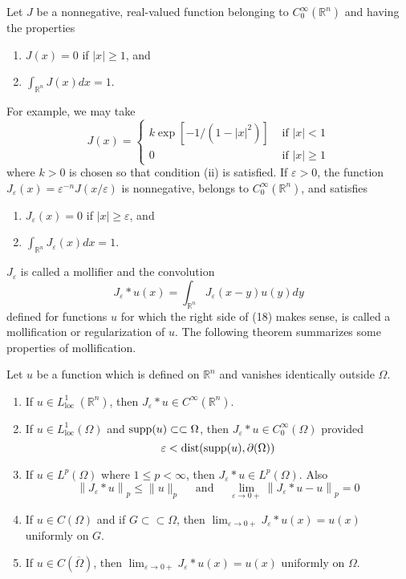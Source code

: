 \begin{para}[Mollifiers]
  Let $J$ be a nonnegative, real-valued function belonging to $C_0^{\infty}(\mathbb{R}^n)$ and having the properties
  \begin{enumerate}[label = (\roman*)]
    \item $J(x)=0$ if $|x| \geq 1$, and
    \item $\int_{\mathbb{R}^n} J(x) d x=1$.
  \end{enumerate}
  For example, we may take
  \[
  J(x)= \begin{cases}k \exp \left[-1 /\left(1-|x|^2\right)\right] & \text { if }|x|<1 \\ 0 & \text { if }|x| \geq 1\end{cases}
  \]
  where $k>0$ is chosen so that condition (ii) is satisfied. If $\varepsilon>0$, the function $J_\varepsilon(x)=\varepsilon^{-n} J(x / \varepsilon)$ is nonnegative, belongs to $C_0^{\infty}(\mathbb{R}^n)$, and satisfies
  \begin{enumerate}[label = (\roman*)]
    \item $J_\varepsilon(x)=0$ if $|x| \geq \varepsilon$, and
    \item $\int_{\mathbb{R}^n} J_\varepsilon(x) d x=1$.
  \end{enumerate}
  $J_\varepsilon$ is called a mollifier and the convolution
  \[
  J_\varepsilon * u(x)=\int_{\mathbb{R}^n} J_\varepsilon(x-y) u(y) d y
  \]
  defined for functions $u$ for which the right side of (18) makes sense, is called
  a mollification or regularization of $u$. The following theorem summarizes some properties of mollification.
\end{para}

\begin{theorem}
  Let $u$ be a function which is defined on $\mathbb{R}^n$ and vanishes identically outside $\Omega$.
  \begin{enumerate}[label = (\alph*)]
    \item If $u \in L_{\text {loc }}^1(\mathbb{R}^n)$, then $J_\varepsilon * u \in C^{\infty}(\mathbb{R}^n)$.
    \item If $u \in L_{\mathrm{loc}}^1(\Omega)$ and $\operatorname{supp}(u) \subset\subset \Omega$, then $J_\varepsilon * u \in C_0^{\infty}(\Omega)$ provided
    \[
    \varepsilon<\operatorname{dist}(\operatorname{supp}(u), \partial(\Omega))
    \]
    \item If $u \in L^p(\Omega)$ where $1 \leq p<\infty$, then $J_\varepsilon * u \in L^p(\Omega)$. Also
    \[
    \left\|J_\varepsilon * u\right\|_p \leq\|u\|_p \quad \text { and } \quad \lim _{\varepsilon \rightarrow 0+}\left\|J_\varepsilon * u-u\right\|_p=0
    \]
    \item If $u \in C(\Omega)$ and if $G \subset\subset \Omega$, then $\lim _{\varepsilon \rightarrow 0+} J_\varepsilon * u(x)=u(x)$ uniformly on $G$.
    \item If $u \in C(\overline{\Omega})$, then $\lim _{\varepsilon \rightarrow 0+} J_\varepsilon * u(x)=u(x)$ uniformly on $\Omega$.
  \end{enumerate}
\end{theorem}

